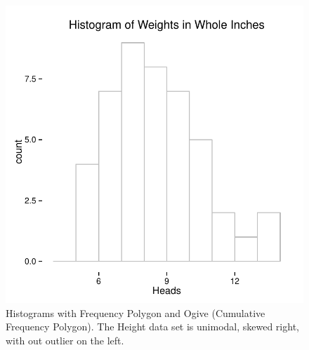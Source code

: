 \documentclass[nohyper,justified]{tufte-handout}\usepackage[]{graphicx}\usepackage[]{color}
\makeatletter
\def\maxwidth{ %
  \ifdim\Gin@nat@width>\linewidth
    \linewidth
  \else
    \Gin@nat@width
  \fi
}
\newenvironment{knitrout}{}{} %
\makeatother
\begin{document}
\begin{knitrout}
\color{fgcolor}\begin{figure}

{\centering \includegraphics[width=\maxwidth]{figure/graphics-histogram-1} 

}

\caption[Histograms with Frequency Polygon and Ogive (Cumulative Frequency Polygon)]{Histograms with Frequency Polygon and Ogive (Cumulative Frequency Polygon). The Height data set is unimodal, skewed right, with out outlier on the left. }\label{fig:histogram1}
\end{figure}

\begin{figure}


\end{figure}
\end{knitrout}
\end{document}
